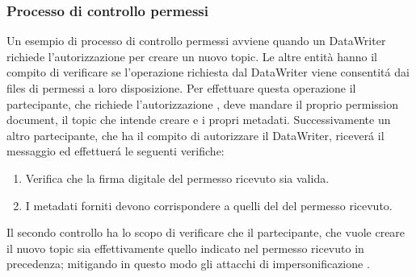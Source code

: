 \subsubsection{Processo di controllo permessi}
Un esempio di processo di controllo permessi avviene
quando un DataWriter richiede l'autorizzazione per creare un nuovo topic.
Le altre entità hanno il compito di verificare se l'operazione 
richiesta dal DataWriter viene consentitá
dai files di permessi a loro disposizione. Per effettuare 
questa operazione il partecipante, che richiede l'autorizzazione ,
deve mandare il proprio permission document, il topic che intende creare e 
i propri metadati. Successivamente un altro partecipante,
che ha il compito di autorizzare il DataWriter,
riceverá il messaggio ed effettuerá le seguenti
verifiche:
\begin{enumerate}
    \item Verifica che la firma digitale del permesso ricevuto sia valida.
    \item I metadati forniti devono corrispondere a quelli del del 
    permesso ricevuto.
\end{enumerate}
Il secondo controllo ha lo scopo di verificare
che il partecipante, che vuole creare il 
nuovo topic sia effettivamente quello indicato nel permesso 
ricevuto in precedenza; mitigando in questo modo gli attacchi di 
impersonificazione 
\cite{DBLP:conf/asiaccs/WangLG24}.
